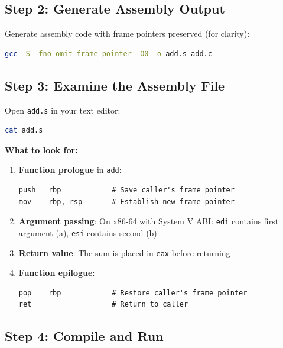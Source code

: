 \subsection{Step 2: Generate Assembly Output}

Generate assembly code with frame pointers preserved (for clarity):

\begin{lstlisting}[language=bash]
gcc -S -fno-omit-frame-pointer -O0 -o add.s add.c
\end{lstlisting}

\subsection{Step 3: Examine the Assembly File}

Open \texttt{add.s} in your text editor:

\begin{lstlisting}[language=bash]
cat add.s
\end{lstlisting}

\textbf{What to look for:}

\begin{enumerate}
\item \textbf{Function prologue} in \texttt{add}:

\begin{lstlisting}
push   rbp            # Save caller's frame pointer
mov    rbp, rsp       # Establish new frame pointer
\end{lstlisting}

\item \textbf{Argument passing}: On x86-64 with System V ABI: \texttt{edi} contains first argument (a), \texttt{esi} contains second (b)

\item \textbf{Return value}: The sum is placed in \texttt{eax} before returning

\item \textbf{Function epilogue}:

\begin{lstlisting}
pop    rbp            # Restore caller's frame pointer
ret                   # Return to caller
\end{lstlisting}
\end{enumerate}

\subsection{Step 4: Compile and Run}

